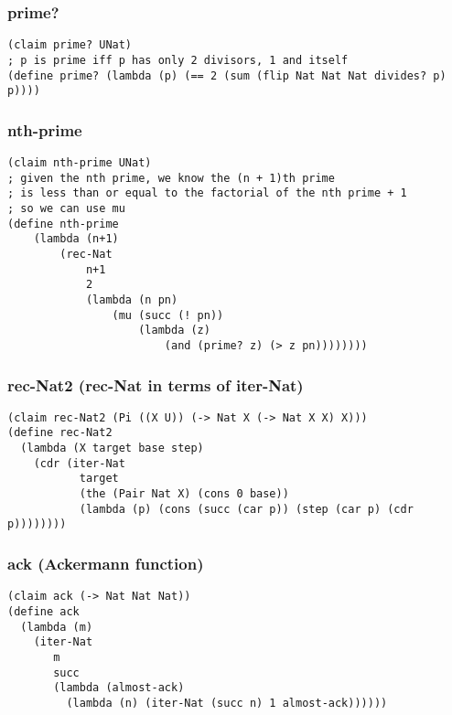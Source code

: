 \subsubsection{prime?} \label{code:prime?}
\begin{verbatim}
(claim prime? UNat)
; p is prime iff p has only 2 divisors, 1 and itself
(define prime? (lambda (p) (== 2 (sum (flip Nat Nat Nat divides? p) p))))
\end{verbatim}

\subsubsection{nth-prime} \label{code:nth-prime}
\begin{verbatim}
(claim nth-prime UNat)
; given the nth prime, we know the (n + 1)th prime
; is less than or equal to the factorial of the nth prime + 1
; so we can use mu
(define nth-prime
    (lambda (n+1)
        (rec-Nat
            n+1
            2
            (lambda (n pn) 
                (mu (succ (! pn)) 
                    (lambda (z) 
                        (and (prime? z) (> z pn))))))))
\end{verbatim}

\subsubsection{rec-Nat2 (rec-Nat in terms of iter-Nat)} \label{code:rec-Nat2}
\begin{verbatim}
(claim rec-Nat2 (Pi ((X U)) (-> Nat X (-> Nat X X) X)))
(define rec-Nat2
  (lambda (X target base step)
    (cdr (iter-Nat
           target
           (the (Pair Nat X) (cons 0 base))
           (lambda (p) (cons (succ (car p)) (step (car p) (cdr p))))))))
\end{verbatim}

\subsubsection{ack (Ackermann function)} \label{code:ack}
\begin{verbatim}
(claim ack (-> Nat Nat Nat))
(define ack
  (lambda (m)
    (iter-Nat
       m
       succ
       (lambda (almost-ack)
         (lambda (n) (iter-Nat (succ n) 1 almost-ack))))))
\end{verbatim}


